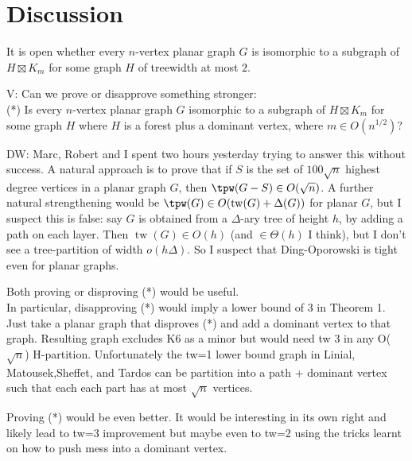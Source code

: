 \documentclass[12pt]{article}
\renewcommand{\geq}{\geqslant}
\renewcommand{\leq}{\leqslant}
\DeclareMathOperator{\tw}{tw}
\newcommand{\PP}{\mathcal{P}}
\newcommand{\david}[1]{{\color{blue} DW: #1}}
\newcommand{\vida}[1]{{\color{DarkGreen} V: #1}}
\newcommand{\robert}[1]{\textcolor{red}{RH: #1}}
\theoremstyle{plain}
\theoremstyle{definition}
\begin{document}








\appendix

\section{Discussion}

It is open whether every $n$-vertex planar graph $G$ is isomorphic to a subgraph of $H \boxtimes K_m$ for some graph $H$ of treewidth at most $2$.

\vida{Can we prove or disapprove something stronger: \\
(*) Is every $n$-vertex planar graph $G$ isomorphic to a subgraph of $H \boxtimes K_m$ for some graph $H$ where $H$ is a forest plus a dominant vertex, where $m\in O(n^{1/2})?$

\david{Marc, Robert and I spent two hours yesterday trying to answer this without success. A natural approach is to prove that if $S$ is the set of $100\sqrt{n}$ highest degree vertices in a planar graph $G$, then $\tpw(G-S)\in O(\sqrt{n})$. A further natural strengthening would be $\tpw(G)\in O(\tw(G)+\Delta(G))$ for planar $G$, but I suspect this is false: say $G$ is obtained from a $\Delta$-ary tree of height $h$, by adding a path on each layer. Then $\tw(G)\in O(h)$ (and $\in\Theta(h)$ I think), but I don't see a tree-partition of width $o(h\Delta)$. So I suspect that Ding-Oporowski is tight even for planar graphs.}

Both proving or disproving (*) would be useful. \\
In particular, disapproving (*) would imply a lower bound of 3 in Theorem 1. Just take a planar graph that disproves (*) and add a dominant vertex to that graph. Resulting graph excludes K6 as a minor but would need tw 3 in any O($\sqrt{n}$) H-partition. Unfortunately the tw=1 lower bound graph in Linial, Matousek,Sheffet, and Tardos can be partition into a path + dominant vertex such that each each part has at most $\sqrt{n}$ vertices.

Proving (*) would be even better. It would be interesting in its own right and likely lead to tw=3 improvement but maybe even to tw=2 using the tricks learnt on how to push mess into a dominant vertex. 
}
\end{document}
